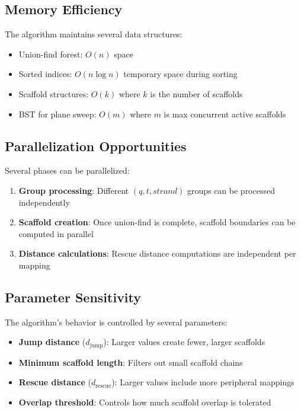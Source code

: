 \documentclass[11pt]{article}
\begin{document}
\subsection{Memory Efficiency}

The algorithm maintains several data structures:
\begin{itemize}
    \item Union-find forest: $O(n)$ space
    \item Sorted indices: $O(n \log n)$ temporary space during sorting
    \item Scaffold structures: $O(k)$ where $k$ is the number of scaffolds
    \item BST for plane sweep: $O(m)$ where $m$ is max concurrent active scaffolds
\end{itemize}

\subsection{Parallelization Opportunities}

Several phases can be parallelized:
\begin{enumerate}
    \item \textbf{Group processing}: Different $(q, t, strand)$ groups can be processed independently
    \item \textbf{Scaffold creation}: Once union-find is complete, scaffold boundaries can be computed in parallel
    \item \textbf{Distance calculations}: Rescue distance computations are independent per mapping
\end{enumerate}

\subsection{Parameter Sensitivity}

The algorithm's behavior is controlled by several parameters:

\begin{itemize}
    \item \textbf{Jump distance} ($d_{\text{jump}}$): Larger values create fewer, larger scaffolds
    \item \textbf{Minimum scaffold length}: Filters out small scaffold chains
    \item \textbf{Rescue distance} ($d_{\text{rescue}}$): Larger values include more peripheral mappings
    \item \textbf{Overlap threshold}: Controls how much scaffold overlap is tolerated
\end{itemize}
\end{document}
